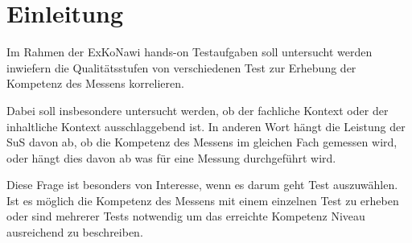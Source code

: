 
\chapter{Einleitung}

Im Rahmen der ExKoNawi hands-on Testaufgaben soll untersucht werden inwiefern die Qualitätsstufen von verschiedenen Test zur Erhebung der Kompetenz des Messens korrelieren. 

Dabei soll insbesondere untersucht werden, ob der fachliche Kontext oder der inhaltliche Kontext ausschlaggebend ist. In anderen Wort hängt die Leistung der SuS davon ab, ob die Kompetenz des Messens im gleichen Fach gemessen wird, oder hängt dies davon ab was für eine Messung durchgeführt wird.

Diese Frage ist besonders von Interesse, wenn es darum geht Test auszuwählen. Ist es möglich die Kompetenz des Messens mit einem einzelnen Test zu erheben oder sind mehrerer Tests notwendig um das erreichte Kompetenz Niveau ausreichend zu beschreiben.







